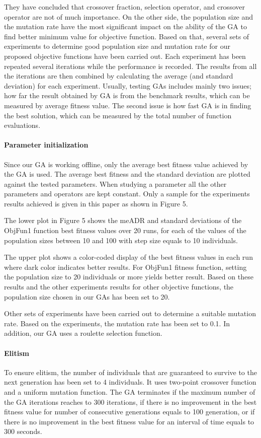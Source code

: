 They have concluded that crossover fraction,
	selection operator,
	and crossover operator are not of much importance.
On the other side,
	the population size and the mutation rate have the most significant impact on the ability of the GA to find better minimum value for objective function.
Based on that,
	several sets of experiments to determine good population size and mutation rate for our proposed objective functions have been carried out.
Each experiment has been repeated several iterations while the performance is recorded.
The results from all the iterations are then combined by calculating the average (and standard deviation) for each experiment.
Usually,
	testing GAs includes mainly two issues;
	how far the result obtained by GA is from the benchmark results,
	which can be measured by average fitness value.
The second issue is how fast GA is in finding the best solution,
	which can be measured by the total number of function evaluations.

\paragraph{Parameter initialization}
Since our GA is working offline,
	only the average best fitness value achieved by the GA is used.
The average best fitness and the standard deviation are plotted against the tested parameters.
When studying a parameter all the other parameters and operators are kept constant.
Only a sample for the experiments results achieved is given in this paper as shown in Figure 5.

The lower plot in Figure 5 shows the me\ac{ADR} and standard deviations of the ObjFun1 function best fitness values over 20 runs,
	for each of the values of the population sizes between 10 and 100 with step size equals to 10 individuals.

The upper plot shows a color-coded display of the best fitness values in each run where dark color indicates better results.
For ObjFun1 fitness function,
	setting the population size to 20 individuals or more yields better result.
Based on these results and the other experiments results for other objective functions,
	the population size chosen in our GAs has been set to 20.

Other sets of experiments have been carried out to determine a suitable mutation rate.
Based on the experiments,
	the mutation rate has been set to 0.1.
In addition,
	our GA uses a roulette selection function.

\paragraph{Elitism}
To ensure elitism,
	the number of individuals that are guaranteed to survive to the next generation has been set to 4 individuals.
It uses two-point crossover function and a uniform mutation function.
The GA terminates if the maximum number of the GA iterations reaches to 300 iterations,
	if there is no improvement in the best fitness value for number of consecutive generations equals to 100 generation,
	or if there is no improvement in the best fitness value for an interval of time equals to 300 seconds.


